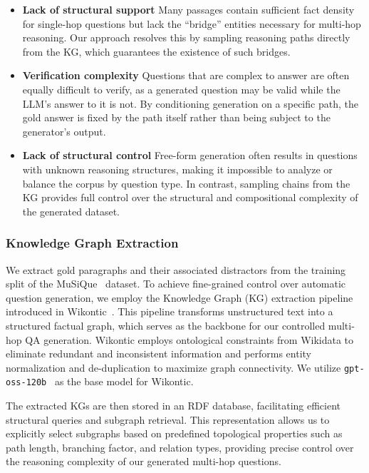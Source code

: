 \documentclass{llmxive}
\begin{document}
\begin{itemize}
    \item  \textbf{Lack of structural support} \hspace{0.5em} Many passages contain sufficient fact density for single-hop questions but lack the ``bridge'' entities necessary for multi-hop reasoning. Our approach resolves this by sampling reasoning paths directly from the KG, which guarantees the existence of such bridges.
    \item  \textbf{Verification complexity} \hspace{0.5em} Questions that are complex to answer are often equally difficult to verify, as a generated question may be valid while the LLM's answer to it is not. By conditioning generation on a specific path, the gold answer is fixed by the path itself rather than being subject to the generator’s output.
    \item  \textbf{Lack of structural control} \hspace{0.5em} Free-form generation often results in questions with unknown reasoning structures, making it impossible to analyze or balance the corpus by question type. In contrast, sampling chains from the KG provides full control over the structural and compositional complexity of the generated dataset.
\end{itemize}    

\subsubsection{Knowledge Graph Extraction}
We extract gold paragraphs and their associated distractors from the training split of the MuSiQue~\citep{musique} dataset. To achieve fine-grained control over automatic question generation, we employ the Knowledge Graph (KG) extraction pipeline introduced in Wikontic~\citep{chepurova-etal-2026-wikontic}. This pipeline transforms unstructured text into a structured factual graph, which serves as the backbone for our controlled multi-hop QA generation. Wikontic employs ontological constraints from Wikidata to eliminate redundant and inconsistent information and performs entity normalization and de-duplication to maximize graph connectivity.   We utilize \texttt{gpt-oss-120b}~\citep{openai2025gptoss120bgptoss20bmodel} as the base model for Wikontic.

The extracted KGs are then stored in an RDF database, facilitating efficient structural queries and subgraph retrieval. This representation allows us to explicitly select subgraphs based on predefined topological properties such as path length, branching factor, and relation types, providing precise control over the reasoning complexity of our generated multi-hop questions.
\end{document}
